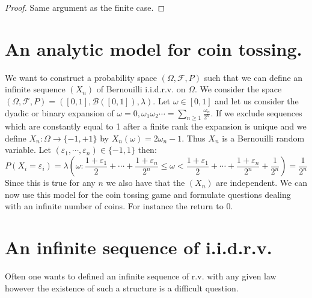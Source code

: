 \documentclass[10pt,a4paper]{book}
\theoremstyle{definition}
\begin{document}
\begin{proof}
Same argument as the finite case. 
\end{proof}

\section{An analytic model for coin tossing.}
We want to construct a probability space $(\Omega, \mathcal{F}, P)$ such that we can define an infinite sequence $(X_n)$ of Bernouilli i.i.d.r.v. on $\Omega$. We consider the space $(\Omega, \mathcal{F}, P) = ([0, 1], \mathcal{B}([0,1]), \lambda)$. Let $\omega \in [0, 1]$ and let us consider the dyadic or binary expansion of $\omega = 0, \omega_1 \omega_2 \cdots = \sum_{n \geq 1} \frac{\omega_n}{2^n}$. If we exclude sequences which are constantly equal to 1 after a finite rank the expansion is unique and we define $X_n : \Omega \to \{-1, +1\}$ by $X_n(\omega) = 2\omega_n - 1$. Thus $X_n$ is a Bernouilli random variable. Let $(\varepsilon_1, \cdots, \varepsilon_n) \in \{-1, 1\}$ then:
\[
P(X_i = \varepsilon_i) =  \lambda(\omega : \frac{1 + \varepsilon_1}{2} + \cdots + \frac{1 + \varepsilon_n}{2^n} \leq \omega < \frac{1 + \varepsilon_1}{2} + \cdots + \frac{1 + \varepsilon_n}{2^n} + \frac{1}{2^n}) = \frac{1}{2^n}
\]  
Since this is true for any $n$ we also have that the $(X_n)$ are independent. We can now use this model for the coin tossing game and formulate questions dealing with an infinite number of coins. For instance the return to 0. 

\section{An infinite sequence of i.i.d.r.v.}
Often one wants to defined an infinite sequence of r.v. with any given law however the existence of such a structure is a difficult question. 
\end{document}

